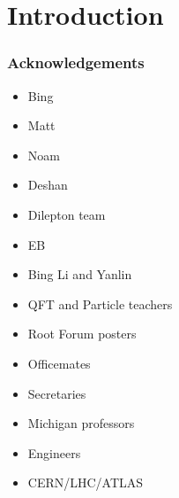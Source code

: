 \chapter{Introduction}


\subsection{Acknowledgements}
\begin{itemize}
    \item Bing
    \item Matt
    \item Noam
    \item Deshan
    \item Dilepton team
    \item EB
    \item Bing Li and Yanlin
    \item QFT and Particle teachers
    \item Root Forum posters
    \item Officemates
    \item Secretaries
    \item Michigan professors
    \item Engineers
    \item CERN/LHC/ATLAS
\end{itemize}

